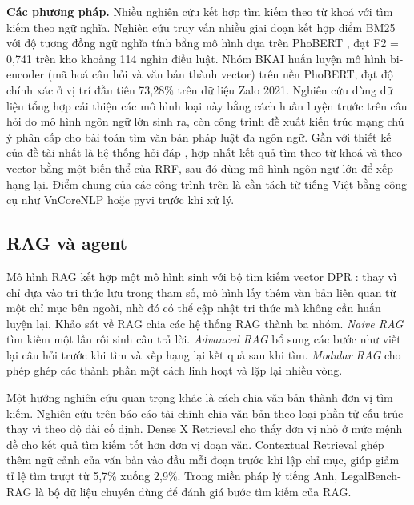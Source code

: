 \textbf{Các phương pháp.} Nhiều nghiên cứu kết hợp tìm kiếm theo từ khoá với tìm kiếm theo ngữ nghĩa. Nghiên cứu truy vấn nhiều giai đoạn \cite{pham2022multistage} kết hợp điểm BM25 với độ tương đồng ngữ nghĩa tính bằng mô hình dựa trên PhoBERT \cite{nguyen2020phobert}, đạt F2 = 0,741 trên kho khoảng 114 nghìn điều luật. Nhóm BKAI \cite{duc2024bkai} huấn luyện mô hình bi-encoder (mã hoá câu hỏi và văn bản thành vector) trên nền PhoBERT, đạt độ chính xác ở vị trí đầu tiên 73,28\% trên dữ liệu Zalo 2021. Nghiên cứu dùng dữ liệu tổng hợp \cite{pham2024synthetic} cải thiện các mô hình loại này bằng cách huấn luyện trước trên câu hỏi do mô hình ngôn ngữ lớn sinh ra, còn công trình \cite{nguyen2024attentive} đề xuất kiến trúc mạng chú ý phân cấp cho bài toán tìm văn bản pháp luật đa ngôn ngữ. Gần với thiết kế của đề tài nhất là hệ thống hỏi đáp \cite{nguyenba2024legalir}, hợp nhất kết quả tìm theo từ khoá và theo vector bằng một biến thể của RRF, sau đó dùng mô hình ngôn ngữ lớn để xếp hạng lại. Điểm chung của các công trình trên là cần tách từ tiếng Việt bằng công cụ như VnCoreNLP \cite{vu2018vncorenlp} hoặc pyvi \cite{tran_pyvi} trước khi xử lý.

\subsection{RAG và agent}

Mô hình RAG \cite{lewis2020rag} kết hợp một mô hình sinh với bộ tìm kiếm vector DPR \cite{karpukhin2020dpr}: thay vì chỉ dựa vào tri thức lưu trong tham số, mô hình lấy thêm văn bản liên quan từ một chỉ mục bên ngoài, nhờ đó có thể cập nhật tri thức mà không cần huấn luyện lại. Khảo sát về RAG \cite{gao2023ragsurvey} chia các hệ thống RAG thành ba nhóm. \emph{Naive RAG} tìm kiếm một lần rồi sinh câu trả lời. \emph{Advanced RAG} bổ sung các bước như viết lại câu hỏi trước khi tìm và xếp hạng lại kết quả sau khi tìm. \emph{Modular RAG} cho phép ghép các thành phần một cách linh hoạt và lặp lại nhiều vòng.

Một hướng nghiên cứu quan trọng khác là cách chia văn bản thành đơn vị tìm kiếm. Nghiên cứu trên báo cáo tài chính \cite{jimeno2024chunking} chia văn bản theo loại phần tử cấu trúc thay vì theo độ dài cố định. Dense X Retrieval \cite{chen2023densex} cho thấy đơn vị nhỏ ở mức mệnh đề cho kết quả tìm kiếm tốt hơn đơn vị đoạn văn. Contextual Retrieval \cite{anthropic2024contextual} ghép thêm ngữ cảnh của văn bản vào đầu mỗi đoạn trước khi lập chỉ mục, giúp giảm tỉ lệ tìm trượt từ 5,7\% xuống 2,9\%. Trong miền pháp lý tiếng Anh, LegalBench-RAG \cite{pipitone2024legalbenchrag} là bộ dữ liệu chuyên dùng để đánh giá bước tìm kiếm của RAG.

